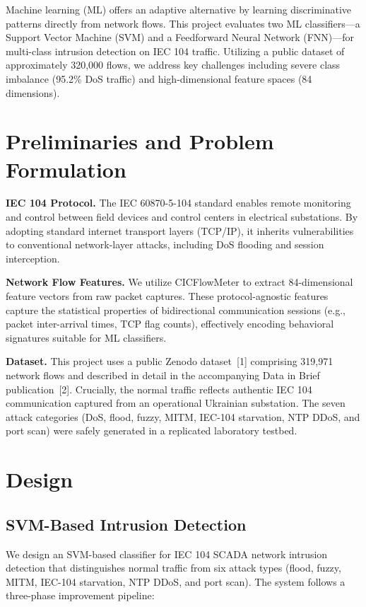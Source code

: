\documentclass{article}
\begin{document}
Machine learning (ML) offers an adaptive alternative by learning discriminative patterns directly from network flows. This project evaluates two ML classifiers---a Support Vector Machine (SVM) and a Feedforward Neural Network (FNN)---for multi-class intrusion detection on IEC 104 traffic. Utilizing a public dataset of approximately 320,000 flows, we address key challenges including severe class imbalance (95.2\% DoS traffic) and high-dimensional feature spaces (84 dimensions).


\section{Preliminaries and Problem Formulation}

\textbf{IEC 104 Protocol.} The IEC 60870-5-104 standard enables remote monitoring and control between field devices and control centers in electrical substations. By adopting standard internet transport layers (TCP/IP), it inherits vulnerabilities to conventional network-layer attacks, including DoS flooding and session interception.

\textbf{Network Flow Features.} We utilize CICFlowMeter to extract 84-dimensional feature vectors from raw packet captures. These protocol-agnostic features capture the statistical properties of bidirectional communication sessions (e.g., packet inter-arrival times, TCP flag counts), effectively encoding behavioral signatures suitable for ML classifiers.

\textbf{Dataset.} This project uses a public Zenodo dataset~[1] comprising 319,971 network flows and described in detail in the accompanying Data in Brief publication~[2]. Crucially, the normal traffic reflects authentic IEC 104 communication captured from an operational Ukrainian substation. The seven attack categories (DoS, flood, fuzzy, MITM, IEC-104 starvation, NTP DDoS, and port scan) were safely generated in a replicated laboratory testbed.

\section{Design}

\subsection{SVM-Based Intrusion Detection}

We design an SVM-based classifier for IEC 104 SCADA network intrusion detection that distinguishes normal traffic from six attack types (flood, fuzzy, MITM, IEC-104 starvation, NTP DDoS, and port scan). The system follows a three-phase improvement pipeline:
\end{document}
